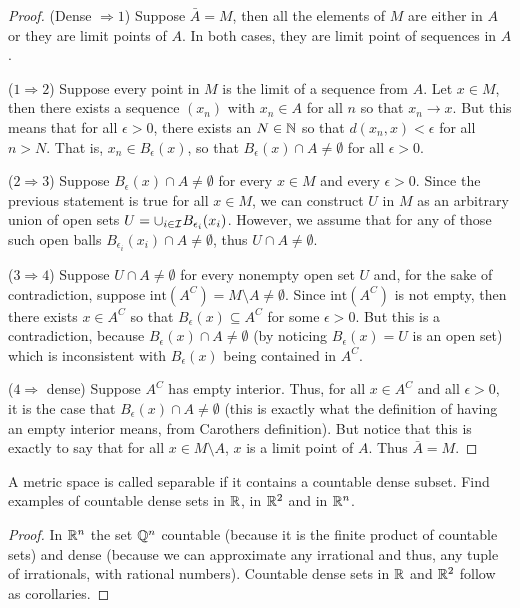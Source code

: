 \begin{proof}
(Dense $\Rightarrow 1$) 
Suppose $\bar{A}=M$, then all the elements of $M$ are either in $A$ or they are limit points of $A$. 
In both cases, they are limit point of sequences in $A$.

($1\Rightarrow 2$)
Suppose every point in $M$ is the limit of a sequence from $A$.
Let $x\in M$, then there exists a sequence $(x_n)$ with $x_n\in A$ for all $n$ so that $x_n\to x$.
But this means that for all $\epsilon>0$, there exists an $N\in\mathbb{N}$ so that $d(x_n,x)<\epsilon$ for all $n>N$.
That is, $x_n\in B_\epsilon(x)$, so that $B_\epsilon(x)\cap A \neq\emptyset$ for all $\epsilon>0$.

($2\Rightarrow 3$)
Suppose $B_\epsilon(x)\cap A \neq\emptyset$ for every $x\in M$ and every $\epsilon>0$.
Since the previous statement is true for all $x\in M$, we can construct $U$ in $M$ as an arbitrary union of open sets $U=\cup_{i\in\mathcal{I}} B_{\epsilon_i}(x_i)$.
However, we assume that for any of those such open balls $B_{\epsilon_i}(x_i)\cap A\neq\emptyset$, thus $U\cap A\neq\emptyset$.

($3\Rightarrow 4$)
Suppose $U\cap A\neq\emptyset$ for every nonempty open set $U$ and, for the sake of contradiction, suppose $\text{int}(A^C) =M\setminus A \neq\emptyset$.
Since $\text{int}(A^C)$ is not empty, then there exists $x\in A^C$ so that $B_\epsilon(x)\subseteq A^C$ for some $\epsilon>0$.
But this is a contradiction, because $B_\epsilon(x)\cap A\neq \emptyset$ (by noticing $B_\epsilon(x)=U$ is an open set) which is inconsistent with $B_\epsilon(x)$ being contained in $A^C$.

($4\Rightarrow$ dense)
Suppose $A^C$ has empty interior.
Thus, for all $x\in A^C$ and all $\epsilon>0$, it is the case that $B_\epsilon(x)\cap A\neq\emptyset$ (this is exactly what the definition of having an empty interior means, from Carothers definition).
But notice that this is exactly to say that for all $x\in M\setminus A$, $x$ is a limit point of $A$.
Thus $\bar{A}=M$.
\end{proof} 

\begin{exercise}{48}
A metric space is called separable if it contains a countable dense subset. 
Find examples of countable dense sets in $\mathbb{R}$, in $\mathbb{R}^2$ and in $\mathbb{R}^n$.
\end{exercise}
\begin{proof}
In $\mathbb{R}^n$ the set $\mathbb{Q}^n$ countable (because it is the finite product of countable sets) and dense (because we can approximate any irrational and thus, any tuple of irrationals, with rational numbers).
Countable dense sets in $\mathbb{R}$ and $\mathbb{R}^2$ follow as corollaries.
\end{proof} 

